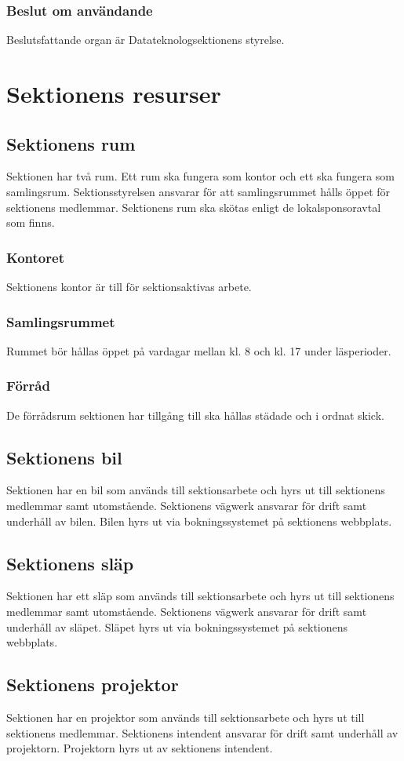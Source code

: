 \documentclass{datateknologsektionen-document}
\begin{document}
\subsubsection{Beslut om användande}
Beslutsfattande organ är Datateknologsektionens styrelse.
\section{Sektionens resurser}
\subsection{Sektionens rum}
Sektionen har två rum. Ett rum ska fungera som kontor och ett ska fungera som samlingsrum.
Sektionsstyrelsen ansvarar för att samlingsrummet hålls öppet för sektionens medlemmar.
Sektionens rum ska skötas enligt de lokalsponsoravtal som finns.
\subsubsection{Kontoret}
Sektionens kontor är till för sektionsaktivas arbete.
\subsubsection{Samlingsrummet}
Rummet bör hållas öppet på vardagar mellan kl. 8 och kl. 17 under läsperioder.
\subsubsection{Förråd}
De förrådsrum sektionen har tillgång till ska hållas städade och i ordnat skick.
\subsection{Sektionens bil}
Sektionen har en bil som används till sektionsarbete och hyrs ut till sektionens medlemmar samt
utomstående. Sektionens vägwerk ansvarar för drift samt underhåll av bilen. Bilen hyrs ut via
bokningssystemet på sektionens webbplats.
\subsection{Sektionens släp}
Sektionen har ett släp som används till sektionsarbete och hyrs ut till sektionens medlemmar samt
utomstående. Sektionens vägwerk ansvarar för drift samt underhåll av släpet. Släpet hyrs ut via
bokningssystemet på sektionens webbplats.
\subsection{Sektionens projektor}
Sektionen har en projektor som används till sektionsarbete och hyrs ut till sektionens medlemmar.
Sektionens intendent ansvarar för drift samt underhåll av projektorn. Projektorn hyrs ut av
sektionens intendent.
\end{document}
